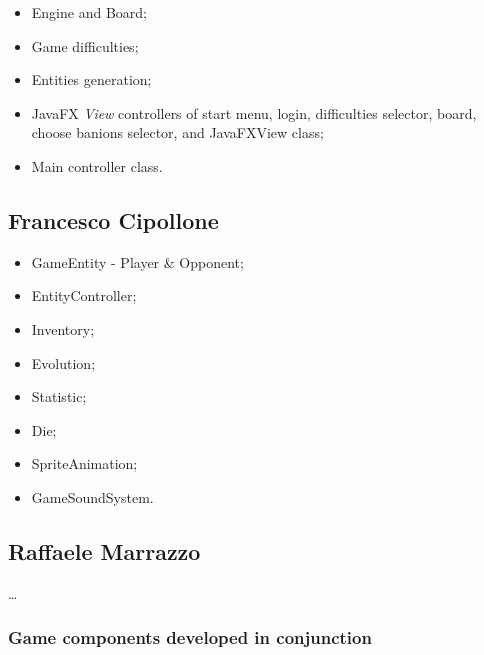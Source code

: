 \documentclass[12pt, a4paper]{report}
\theoremstyle{definition}
\begin{document}
    \begin{itemize}
        \item Engine and Board;
        \item Game difficulties;
        \item Entities generation;
        \item JavaFX \emph{View} controllers of start menu, login, difficulties selector, board, choose banions selector, and JavaFXView class;
        \item Main controller class.
    \end{itemize}

    \subsection*{Francesco Cipollone}

    \begin{itemize}
        \item GameEntity - Player \& Opponent;
        \item EntityController;
        \item Inventory;
        \item Evolution;
        \item Statistic;
        \item Die;
        \item SpriteAnimation;
        \item GameSoundSystem.
    \end{itemize}

    \subsection*{Raffaele Marrazzo}

    \dots

    \subsubsection*{Game components developed in conjunction}
\end{document}
